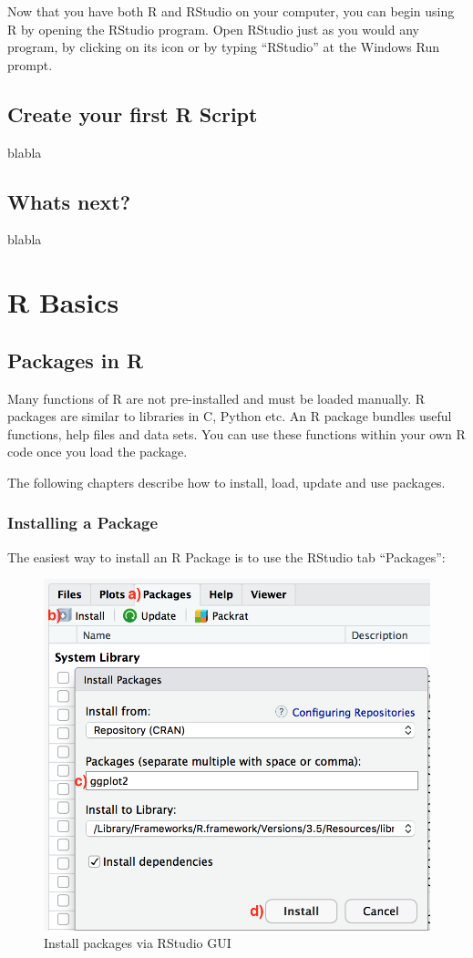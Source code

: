 \documentclass[
]{book}
\begin{document}
Now that you have both R and RStudio on your computer, you can begin using R by opening the RStudio program. Open RStudio just as you would any program, by clicking on its icon or by typing ``RStudio'' at the Windows Run prompt.

\hypertarget{create-your-first-r-script}{%
\section{Create your first R Script}\label{create-your-first-r-script}}

blabla

\hypertarget{whats-next}{%
\section{Whats next?}\label{whats-next}}

blabla

\hypertarget{r-basics}{%
\chapter{R Basics}\label{r-basics}}

\hypertarget{packages}{%
\section{Packages in R}\label{packages}}

Many functions of R are not pre-installed and must be loaded manually. R packages are similar to libraries in C, Python etc. An R package bundles useful functions, help files and data sets. You can use these functions within your own R code once you load the package.

The following chapters describe how to install, load, update and use packages.

\hypertarget{installing-a-package}{%
\subsection{Installing a Package}\label{installing-a-package}}

The easiest way to install an R Package is to use the RStudio tab ``Packages'':

\begin{figure}
\includegraphics[width=0.5\linewidth]{images/a2-installPackagesRStudio} \caption{Install packages via RStudio GUI}\label{fig:knitr-logo}
\end{figure}
\end{document}
